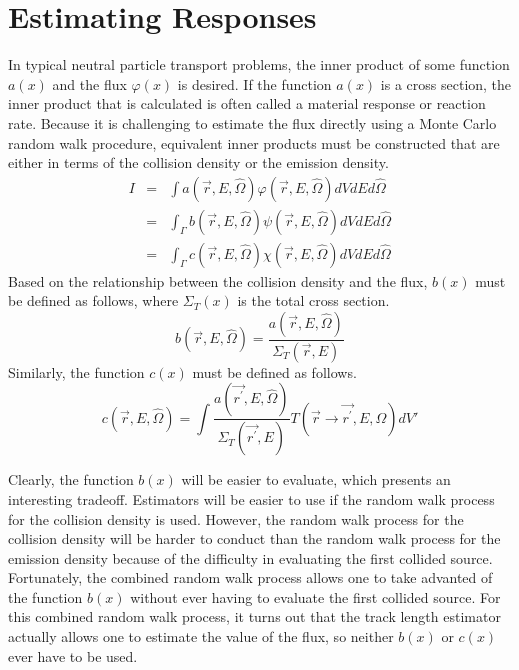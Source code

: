 \section{Estimating Responses}
In typical neutral particle transport problems, the inner product of some 
function $a(x)$ and the flux $\varphi(x)$ is desired. If the function $a(x)$ is
a cross section, the inner product that is calculated is often called a 
material response or reaction rate. Because it is challenging to estimate the
flux directly using a Monte Carlo random walk procedure, equivalent inner 
products must be constructed that are either in terms of the collision density 
or the emission density. 
\begin{eqnarray}
  I & = & \int a(\vec{r},E,\hat{\Omega}) \varphi(\vec{r},E,\hat{\Omega}) 
  dVdEd\hat{\Omega} \\
  & = & \int_{\Gamma} b(\vec{r},E,\hat{\Omega}) \psi(\vec{r},E,\hat{\Omega})  
  dVdEd\hat{\Omega} \\
  & = & \int_{\Gamma} c(\vec{r},E,\hat{\Omega}) \chi(\vec{r},E,\hat{\Omega}) 
  dVdEd\hat{\Omega}
\end{eqnarray}
Based on the relationship between the collision density and the flux, $b(x)$
must be defined as follows, where $\Sigma_T(x)$ is the total cross section.
\begin{equation}
  b(\vec{r},E,\hat{\Omega}) = \frac{a(\vec{r},E,\hat{\Omega})}
  {\Sigma_T(\vec{r},E)}
  \label{eq:collision_response_function}
\end{equation}
Similarly, the function $c(x)$ must be defined as follows.
\begin{equation}
  c(\vec{r},E,\hat{\Omega}) = \int \frac{a(\vec{r^{'}},E,\hat{\Omega})}
  {\Sigma_T(\vec{r^{'}},E)} T(\vec{r} \to \vec{r^{'}},E,\Omega)dV'
  \label{eq:emission_response_function}
\end{equation}

Clearly, the function $b(x)$ will be easier to evaluate, which presents an 
interesting tradeoff. Estimators will be easier to use if the random walk 
process for the collision density is used. However, the random walk process
for the collision density will be harder to conduct than the random walk 
process for the emission density because of the difficulty in evaluating the 
first collided source. Fortunately, the combined random walk process allows 
one to take advanted of the function $b(x)$ without ever having to evaluate
the first collided source. For this combined random walk process, it turns out 
that the track length estimator actually allows one to estimate the value of 
the flux, so neither $b(x)$ or $c(x)$ ever have to be used.
